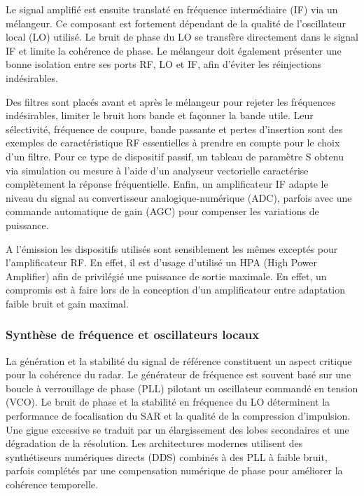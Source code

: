 Le signal amplifié est ensuite translaté en fréquence intermédiaire (IF) via un mélangeur. Ce composant est fortement dépendant de la qualité de l’oscillateur local (LO) utilisé. Le bruit de phase du LO se transfère directement dans le signal IF et limite la cohérence de phase. Le mélangeur doit également présenter une bonne isolation entre ses ports RF, LO et IF, afin d’éviter les réinjections indésirables.

Des filtres sont placés avant et après le mélangeur pour rejeter les fréquences indésirables, limiter le bruit hors bande et façonner la bande utile. Leur sélectivité, fréquence de coupure, bande passante et pertes d'insertion sont des exemples de caractéristique RF essentielles à prendre en compte pour le choix d'un filtre. Pour ce type de dispositif passif, un tableau de paramètre S obtenu via simulation ou mesure à l'aide d'un analyseur vectorielle caractérise complètement la réponse fréquentielle. Enfin, un amplificateur IF adapte le niveau du signal au convertisseur analogique-numérique (ADC), parfois avec une commande automatique de gain (AGC) pour compenser les variations de puissance.

A l'émission les dispositifs utilisés sont sensiblement les mêmes exceptés pour l'amplificateur RF. En effet, il est d'usage d'utilisé un HPA (High Power Amplifier) afin de privilégié une puissance de sortie maximale. En effet, un compromis est à faire lors de la conception d'un amplificateur entre adaptation faible bruit et gain maximal. 

\subsubsection{Synthèse de fréquence et oscillateurs locaux}

La génération et la stabilité du signal de référence constituent un aspect critique pour la cohérence du radar. Le générateur de fréquence est souvent basé sur une boucle à verrouillage de phase (PLL) pilotant un oscillateur commandé en tension (VCO). Le bruit de phase et la stabilité en fréquence du LO déterminent la performance de focalisation du SAR et la qualité de la compression d’impulsion. Une gigue excessive se traduit par un élargissement des lobes secondaires et une dégradation de la résolution. Les architectures modernes utilisent des synthétiseurs numériques directs (DDS) combinés à des PLL à faible bruit, parfois complétés par une compensation numérique de phase pour améliorer la cohérence temporelle. 

